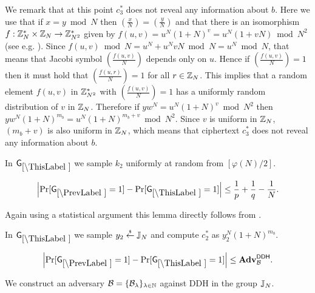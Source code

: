 We remark that at this point $c_3^*$ does not reveal any information about $b$. Here we use that if $x = y \bmod N$ then $\left( \frac{x}{N} \right)= \left( \frac{y}{N} \right)$ and that there is an isomorphism $f:\mathbb{Z}_N^* \times \mathbb{Z}_N \rightarrow\mathbb{Z}_{N^2}^*$ given by $f(u,v)=u^N(1+N)^v = u^N(1+vN) \bmod N^2$ (see e.g. \cite[Proposition 13.6]{books/crc/KatzLindell2014}).  Since $f(u,v) \bmod N = u^N + u^NvN \bmod N = u^N \bmod N$, that means that Jacobi symbol $\left( \frac{f(u,v)}{N} \right)$ depends only on $u$. Hence if $\left( \frac{f(u,v)}{N} \right) = 1$ then it must hold that $\left( \frac{f(u,r)}{N} \right) = 1$ for all $r \in \mathbb{Z}_N$. This implies that a random element $f(u,v)$ in $\mathbb{Z}_{N^2}^*$ with $\left( \frac{f(u,v)}{N} \right) = 1$ has a uniformly random distribution of $v$ in $\mathbb{Z}_N$. Therefore if $yw^N = u^N(1+N)^v \bmod N^2$ then  $yw^N(1+N)^{m_b}  = u^N(1+N)^{m_b+v} \bmod N^2$. Since $v$ is uniform in $\mathbb{Z}_N$, $(m_b + v)$ is also uniform in $\mathbb{Z}_N$, which means that ciphertext $c_3^*$ does not reveal any information about $b$. 

In $\games_\thisgame$ we sample $k_2$ uniformly at random from $[\varphi(N)/2]$. 

\begin{lemma}
\[
\left|\Pr[\games_\prevgame = 1] - \Pr[\games_\thisgame = 1]\right| \leq \frac{1}{p}+\frac{1}{q}-\frac{1}{N}.
\]
\end{lemma}

Again using a statistical argument this lemma directly follows from .

In $\games_\thisgame$ we sample $y_2 \stackrel{{\scriptscriptstyle\$}}{\leftarrow} \mathbb{J}_N$ and compute $c_2^*$ as  $y_2^N(1+N)^{m_b}$. 

\begin{lemma}\label{lem:ddh-rom-lh}
\[
\left|\Pr[\games_\prevgame = 1] - \Pr[\games_\thisgame = 1]\right| \leq \advtg_\advB^\ddh.
\]
\end{lemma}
We construct an adversary $\mathcal{B} = \{\mathcal{B}_{\lambda}\}_{\lambda \in \mathbb{N}}$ against DDH in the group $\mathbb{J}_N$. %

